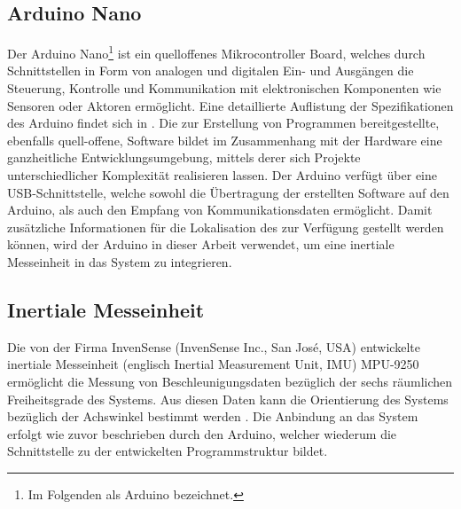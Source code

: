 \subsection{Arduino\textsuperscript{\texttrademark} Nano}
\label{chap.arduino}
Der Arduino\textsuperscript{\texttrademark} Nano\footnote{Im Folgenden als Arduino bezeichnet.} ist ein quelloffenes Mikrocontroller Board, welches durch Schnittstellen in Form von analogen und digitalen Ein- und Ausgängen die Steuerung, Kontrolle und Kommunikation mit elektronischen Komponenten wie Sensoren oder Aktoren ermöglicht. Eine detaillierte Auflistung der Spezifikationen des Arduino findet sich in . Die zur Erstellung von Programmen bereitgestellte, ebenfalls quell-offene, Software bildet im Zusammenhang mit der Hardware eine ganzheitliche Entwicklungsumgebung, mittels derer sich Projekte unterschiedlicher Komplexität realisieren lassen. Der Arduino verfügt über eine USB-Schnittstelle, welche sowohl die Übertragung der erstellten Software auf den Arduino, als auch den Empfang von Kommunikationsdaten ermöglicht. Damit zusätzliche Informationen für die Lokalisation des  zur Verfügung gestellt werden können, wird der Arduino in dieser Arbeit verwendet, um eine inertiale Messeinheit in das System zu integrieren.

\prever{
}


\subsection{Inertiale Messeinheit}
\label{chap.imu}
Die von der Firma InvenSense (InvenSense Inc., San Jos\'e, USA) entwickelte inertiale Messeinheit (englisch Inertial Measurement Unit, IMU) MPU-9250 ermöglicht die Messung von Beschleunigungsdaten bezüglich der sechs räumlichen Freiheitsgrade des Systems. Aus diesen Daten kann die Orientierung des Systems bezüglich der Achswinkel bestimmt werden \cite{IMU}. Die Anbindung an das System erfolgt wie zuvor beschrieben durch den Arduino, welcher wiederum die Schnittstelle zu der entwickelten Programmstruktur bildet.
\prever{
}


